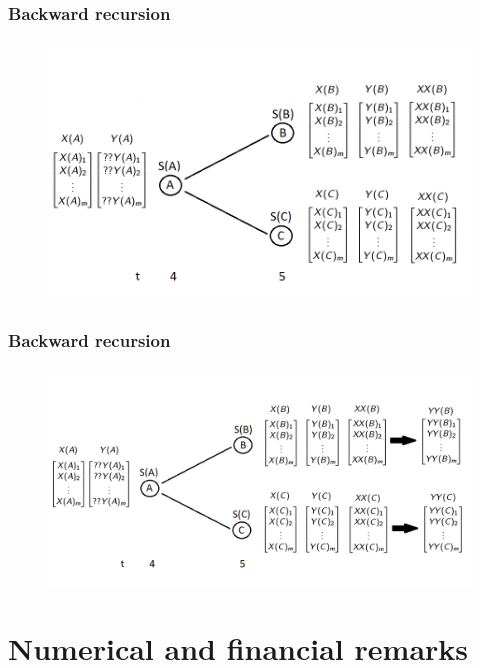 \documentclass{beamer}
\begin{document}
\begin{frame}
\frametitle{Backward recursion}
\begin{figure}[T]
	\includegraphics[scale=0.45]{backwardtree3}
\end{figure}
\end{frame}

\begin{frame}
\frametitle{Backward recursion}
\begin{figure}[T]
	\includegraphics[scale=0.40]{backwardtree4}
\end{figure}
\end{frame}


\section{Numerical and financial remarks}
\end{document}

